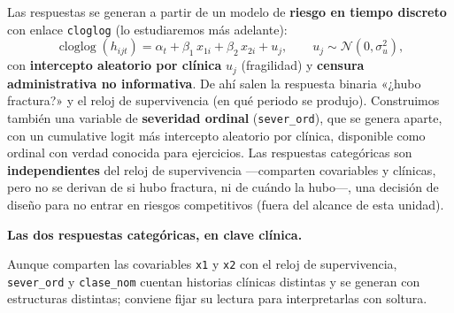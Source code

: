 \documentclass[
  letterpaper,
  DIV=11,
  numbers=noendperiod]{scrartcl}
\begin{document}
Las respuestas se generan a partir de un modelo de \textbf{riesgo en
tiempo discreto} con enlace \texttt{cloglog} (lo estudiaremos más
adelante):
\[\operatorname{cloglog}(h_{ijt})=\alpha_t+\beta_1\,x_{1i}+\beta_2\,x_{2i}+u_j,
\qquad u_j\sim\mathcal{N}(0,\sigma_u^2),\] con \textbf{intercepto
aleatorio por clínica} \(u_j\) (fragilidad) y \textbf{censura
administrativa no informativa}. De ahí salen la respuesta binaria «¿hubo
fractura?» y el reloj de supervivencia (en qué periodo se produjo).
Construimos también una variable de \textbf{severidad ordinal}
(\texttt{sever\_ord}), que se genera aparte, con un cumulative logit más
intercepto aleatorio por clínica, disponible como ordinal con verdad
conocida para ejercicios. Las respuestas categóricas son
\textbf{independientes} del reloj de supervivencia ---comparten
covariables y clínicas, pero no se derivan de si hubo fractura, ni de
cuándo la hubo---, una decisión de diseño para no entrar en riesgos
competitivos (fuera del alcance de esta unidad).

\textbf{Las dos respuestas categóricas, en clave clínica.}

Aunque comparten las covariables \texttt{x1} y \texttt{x2} con el reloj
de supervivencia, \texttt{sever\_ord} y \texttt{clase\_nom} cuentan
historias clínicas distintas y se generan con estructuras distintas;
conviene fijar su lectura para interpretarlas con soltura.
\end{document}
